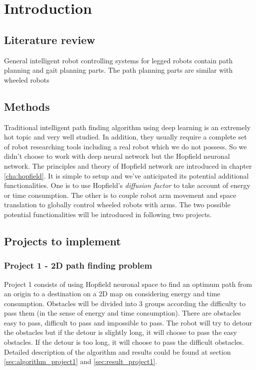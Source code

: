 \chapter{Introduction}
\label{cha:introduction}
\section{Literature review}
\label{sec:review}

General intelligent robot controlling systems for legged robots contain path planning and gait planning parts. 
The path planning parts are similar with wheeled robots 

\section{Methods}
\label{sec:method}
Traditional intelligent path finding algorithm using deep learning is an extremely hot topic and very well studied.
In addition, they usually require a complete set of robot researching tools including a real robot which we do not possess.
So we didn't choose to work with deep neural network but the Hopfield neuronal network.
The principles and theory of Hopfield network are introduced in chapter \ref{cha:hopfield}.
It is simple to setup and we've anticipated its potential additional functionalities.
One is to use Hopfield's \textit{diffusion factor} to take account of energy or time consumption.
The other is to couple robot arm movement and space translation to globally control wheeled robots with arms.
The two possible potential functionalities will be introduced in following two projects.


\section{Projects to implement}
\label{sec:projects}

\subsection{Project 1 - 2D path finding problem}
\label{ssec:project1}

Project 1 consists of using Hopfield neuronal space to find an optimum path from an origin to a destination on a 2D map
on considering energy and time consumption.
Obstacles will be divided into 3 groups according the difficulty to pass them (in the sense of energy and time consumption).
There are obstacles easy to pass, difficult to pass and impossible to pass.
The robot will try to detour the obstacles but if the detour is slightly long, it will choose to pass the easy obstacles.
If the detour is too long, it will choose to pass the difficult obstacles.
Detailed description of the algorithm and results could be found at section \ref{sec:algorithm_project1} and
\ref{sec:result_project1}.


